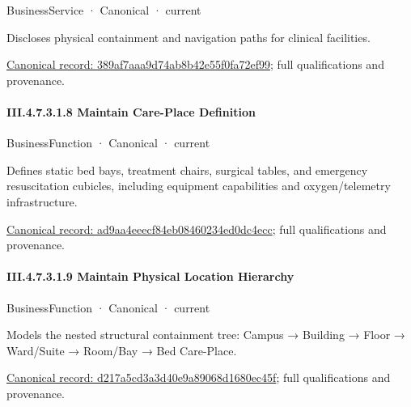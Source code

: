\label{element:389af7aaa9d74ab8b42e55f0fa72ef99}
{\small BusinessService · Canonical · current}\par

Discloses physical containment and navigation paths for clinical facilities.


{\footnotesize \href{../../../../../../../../continuum/business/business-service/389af7aaa9d74ab8b42e55f0fa72ef99.md}{Canonical record: 389af7aaa9d74ab8b42e55f0fa72ef99}; full qualifications and provenance.}\par
\paragraph*{III.4.7.3.1.8 Maintain Care-Place Definition}
\label{navigation:III.4.7.3.1.8}

\label{element:ad9aa4eeecf84eb08460234ed0dc4ecc}
{\small BusinessFunction · Canonical · current}\par

Defines static bed bays, treatment chairs, surgical tables, and emergency resuscitation cubicles, including equipment capabilities and oxygen/telemetry infrastructure.


{\footnotesize \href{../../../../../../../../continuum/business/business-function/ad9aa4eeecf84eb08460234ed0dc4ecc.md}{Canonical record: ad9aa4eeecf84eb08460234ed0dc4ecc}; full qualifications and provenance.}\par
\paragraph*{III.4.7.3.1.9 Maintain Physical Location Hierarchy}
\label{navigation:III.4.7.3.1.9}

\label{element:d217a5cd3a3d40e9a89068d1680ec45f}
{\small BusinessFunction · Canonical · current}\par

Models the nested structural containment tree: Campus → Building → Floor → Ward/Suite → Room/Bay → Bed Care-Place.


{\footnotesize \href{../../../../../../../../continuum/business/business-function/d217a5cd3a3d40e9a89068d1680ec45f.md}{Canonical record: d217a5cd3a3d40e9a89068d1680ec45f}; full qualifications and provenance.}\par
